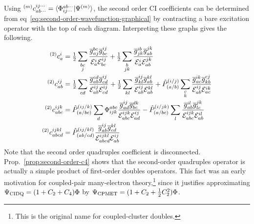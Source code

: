 \documentclass[11pt]{article}
\numberwithin{equation}{section}
\begin{document}
\begin{ex}
Using
${}^{(m)}c_{ab\cdots}^{ij\cdots}=\langle\Phi _{ij\cdots}^{ab\cdots}|\Psi ^{(m)}\rangle$, the second order CI coefficients can be determined from eq~\ref{eq:second-order-wavefunction-graphical} by contracting a bare excitation operator with the top of each diagram.
Interpreting these graphs gives the following.
\begin{align*}
  {}^{(2)}c_a^i
&=
  \tfrac{1}{2}
  \sum_{\substack{bc\\j}}
  \frac {
    \overline{g}_{aj}^{bc}
    \overline{g}_{bc}^{ij}
  }{
    \mathcal{E}_a^i
    \mathcal{E}_{bc}^{ij}
  }
+
  \tfrac{1}{2}
  \sum_{\substack{b\\jk}}
  \frac {
    \overline{g}_{jk}^{ib}
    \overline{g}_{ab}^{jk}
  }{
    \mathcal{E}_a^i
    \mathcal{E}_{ab}^{jk}
  }
\\
  {}^{(2)}c_{ab}^{ij}
&=
  \tfrac{1}{2}
  \sum_{\substack{cd}}
  \frac {
    \overline{g}_{ab}^{cd}
    \overline{g}_{cd}^{ij}
  }{
    \mathcal{E}_{ab}^{ij}
    \mathcal{E}_{cd}^{ij}
  }
+
  \tfrac{1}{2}
  \sum_{\substack{kl}}
  \frac {
    \overline{g}_{kl}^{ij}
    \overline{g}_{ab}^{kl}
  }{
    \mathcal{E}_{ab}^{ij}
    \mathcal{E}_{ab}^{kl}
  }
+
  \hat{P}_{(a/b)}^{(i/j)}
  \sum_{\substack{c\\k}}
  \frac {
    \overline{g}_{ac}^{ik}
    \overline{g}_{kb}^{cj}
  }{
    \mathcal{E}_{ab}^{ij}
    \mathcal{E}_{ac}^{ik}
  }
\\
  {}^{(2)}c_{abc}^{ijk}
&=
  \hat{P}_{(a/bc)}^{(ij/k)}
  \sum_{\substack{d}}
  \Phi _{ijk}^{abc}
  \frac {
    \overline{g}_{ad}^{ij}
    \overline{g}_{bc}^{dk}
  }{
    \mathcal{E}_{abc}^{ijk}
    \mathcal{E}_{ad}^{ij}
  }
-
  \hat{P}_{(a/bc)}^{(i/jk)}
  \sum_{\substack{l}}
  \frac {
    \overline{g}_{ab}^{il}
    \overline{g}_{lc}^{jk}
  }{
    \mathcal{E}_{abc}^{ijk}
    \mathcal{E}_{ab}^{il}
  }
\\
  {}^{(2)}c_{abcd}^{ijkl}
&=
  \hat{P}_{(ab/cd)}^{(ij/kl)}
  \frac {
    \overline{g}_{ab}^{ij}
    \overline{g}_{cd}^{kl}
  }{
    \mathcal{E}_{abcd}^{ijkl}
    \mathcal{E}_{ab}^{ij}
  }
\end{align*}
Note that the second order quadruples coefficient is disconnected.
Prop.~\ref{prop:second-order-c4} shows that the second-order quadruples operator is actually a simple product of first-order doubles operators.
This fact was an early motivation for coupled-pair many-electron theory,\footnote{This is the original name for coupled-cluster doubles.} since it justifies approximating
$
  \Psi _{\mathrm{CIDQ}}
=
  (1+C_2+C_4)\Phi 
$
by
$
  \Psi _{\mathrm{CPMET}}
=
  (1 + C_2 + \tfrac{1}{2}C_2^2)\Phi 
$.
\end{ex}
\end{document}
